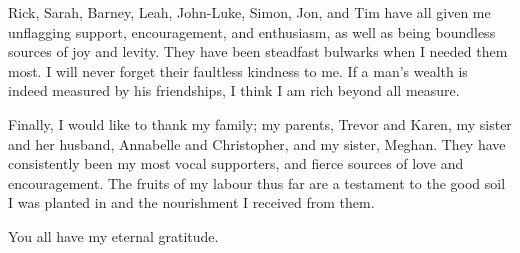\begin{acknowledgements}
{		Rick, Sarah, Barney, Leah, John-Luke, Simon, Jon, and Tim have all given me 
		unflagging support, encouragement, and enthusiasm, as well as being boundless sources 
		of joy and levity. They have been steadfast bulwarks when I needed them most. I will 
		never forget their faultless kindness to me. If a man's wealth is indeed measured by 
		his friendships, I think I am rich beyond all measure.
		
		Finally, I would like to thank my family; my parents, Trevor and Karen, my 
		sister and her husband, Annabelle and Christopher, and my sister, Meghan. They
		have  consistently been my most vocal supporters, and fierce sources of love and
		encouragement. The fruits of my labour thus far are a testament to the good 
		soil I was planted in and the nourishment I received from them.
		
		You all have my eternal gratitude.}
	
\end{acknowledgements}
